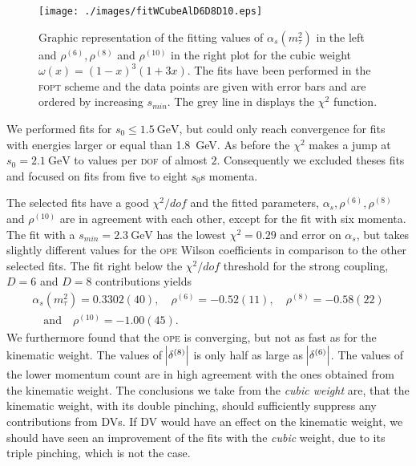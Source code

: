 \documentclass[../../index.tex]{subfiles}
\begin{document}
\begin{figure}
  \centering \texttt{[image: ./images/fitWCubeAlD6D8D10.eps]}
  \caption{Graphic representation of the fitting values of
    \(\alpha_s(m_\tau^2)\) in the left and \(\rho^{(6)}, \rho^{(8)}\) and
    \(\rho^{(10)}\) in the right plot for the cubic weight
    \(\omega(x)=(1-x)^3(1+3x)\). The fits have been performed in the
    \textsc{fopt} scheme and the data points are given with error bars and are
    ordered by increasing \(s_{min}\). The grey line in displays the \(\chi^2\)
    function.}
  \label{fig:fitWCubeAlpha}
\end{figure}

We performed fits for \(s_0 \leq \SI{1.5}{\giga\eV}\), but could only
reach convergence for fits with energies larger or equal than
\SI{1.8}{\giga\eV}. As before the \(\chi^2\) makes a jump at
\(s_0=\SI{2.1}{\giga\eV}\) to values per \textsc{dof} of almost \(2\).
Consequently we excluded theses fits and focused on fits from five to eight
\(s_0\)s momenta.

The selected fits have a good \(\chi^2/dof\) and the fitted parameters,
\(\alpha_s, \rho^{(6)}, \rho^{(8)}\) and \(\rho^{(10)}\) are in agreement with
each other, except for the fit with six momenta. The fit with a
\(s_{min}=\SI{2.3}{\giga\eV}\) has the lowest \(\chi^2=0.29\) and error on
\(\alpha_s\), but takes slightly different values for the \textsc{ope} Wilson
coefficients in comparison to the other selected fits. The fit right below the
\(\chi^2/dof\) threshold for the strong coupling, \(D=6\) and \(D=8\)
contributions yields
\begin{equation}
  \begin{split}
    \alpha_s(m_\tau^2)=0.3302(40), \quad \rho^{(6)}=-0.52(11), \quad \rho^{(8)}=-0.58(22)\\
    \quad \text{and} \quad \rho^{(10)}=-1.00(45).
  \end{split}
\end{equation}
We furthermore found that the \textsc{ope} is converging, but not as fast as for
the kinematic weight. The values of \(\abs{\delta^{(8)}}\) is only half as large
as \(\abs{\delta^{(6)}}\). The values of the lower momentum count are in high
agreement with the ones obtained from the kinematic weight. The conclusions
we take from the \textit{cubic weight} are, that the kinematic weight, with its
double pinching, should sufficiently suppress any contributions from
\textsc{DV}s. If \textsc{DV} would have an effect on the kinematic weight, we
should have seen an improvement of the fits with the \textit{cubic} weight, due
to its triple pinching, which is not the case.
\end{document}
